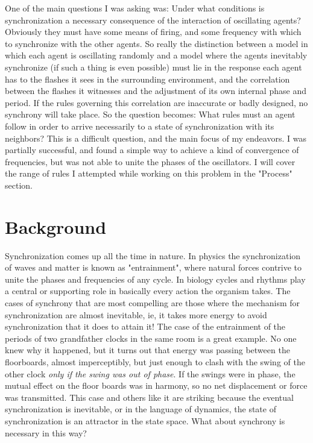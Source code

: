 \documentclass[12pt]{article}
\begin{document}
One of the main questions I was asking was:  Under what conditions is synchronization a necessary consequence of the interaction of oscillating agents?  Obviously they must have some means of firing, and some frequency with which to synchronize with the other agents.  So really the distinction between a model in which each agent is oscillating randomly and a model where the agents inevitably synchronize (if such a thing is even possible) must lie in the response each agent has to the flashes it sees in the surrounding environment, and the correlation between the flashes it witnesses and the adjustment of its own internal phase and period.  If the rules governing this correlation are inaccurate or badly designed, no synchrony will take place.  So the question becomes:  What rules must an agent follow in order to arrive necessarily to a state of synchronization with its neighbors?  This is a difficult question, and the main focus of my endeavors.  I was partially successful, and found a simple way to achieve a kind of convergence of frequencies, but was not able to unite the phases of the oscillators.  I will cover the range of rules I attempted while working on this problem in the "Process" section.

\section{Background}

Synchronization comes up all the time in nature.  In physics the synchronization of waves and matter is known as "entrainment", where natural forces contrive to unite the phases and frequencies of any cycle.  In biology cycles and rhythms play a central or supporting role in basically every action the organism takes.  The cases of synchrony that are most compelling are those where the mechanism for synchronization are almost inevitable, ie, it takes more energy to avoid synchronization that it does to attain it!  The case of the entrainment of the periods of two grandfather clocks in the same room is a great example.  No one knew why it happened, but it turns out that energy was passing between the floorboards, almost imperceptibly, but just enough to clash with the swing of the other clock {\em only if the swing was out of phase}.  If the swings were in phase, the mutual effect on the floor boards was in harmony, so no net displacement or force was transmitted.  This case and others like it are striking because the eventual synchronization is inevitable, or in the language of dynamics, the state of synchronization is an attractor in the state space.  What about synchrony is necessary in this way?  
\end{document}
